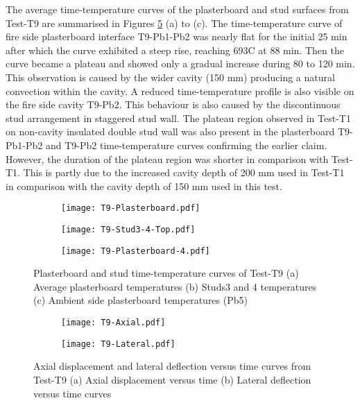 The average time-temperature curves of the plasterboard and stud surfaces from Test-T9 are summarised in Figures \ref{fig:T9-time-temperature-b} (a) to (c). The time-temperature curve of fire side plasterboard interface T9-Pb1-Pb2 was nearly flat for the initial 25 min after which the curve exhibited a steep rise, reaching 693\degree C at 88 min. Then the curve became a plateau and showed only a gradual increase during 80 to 120 min. This observation is caused by the wider cavity (150 mm) producing a natural convection within the cavity. A reduced time-temperature profile is also visible on the fire side cavity T9-Pb2. This behaviour is also caused by the discontinuous stud arrangement in staggered stud wall. The plateau region observed in Test-T1 on non-cavity insulated double stud wall was also present in the plasterboard T9-Pb1-Pb2 and T9-Pb2 time-temperature curves confirming the earlier claim. However, the duration of the plateau region was shorter in comparison with Test-T1. This is partly due to the increased cavity depth of 200 mm used in Test-T1 in comparison with the cavity depth of 150 mm used in this test.  
\begin{figure}[!htbp]
	\centering
	\begin{subfigure}[b]{0.7\textwidth}
		\centering
		\texttt{[image: T9-Plasterboard.pdf]}
		\caption{}
		\label{subfig:T9-Plasterboard}
	\end{subfigure}
	\begin{subfigure}[b]{0.7\textwidth}
		\centering
		\texttt{[image: T9-Stud3-4-Top.pdf]}
		\caption{}
		\label{subfig:T9-Studs-3-4-Top}
	\end{subfigure}
	\label{fig:T9-time-temperature-a}
\end{figure}
\begin{figure}[!htbp]
	\ContinuedFloat
	\centering
	\begin{subfigure}[b]{0.7\textwidth}
		\centering
		\texttt{[image: T9-Plasterboard-4.pdf]}
		\caption{}
		\label{subfig:T9-Plasterboard-5}
	\end{subfigure}
	\caption{Plasterboard and stud time-temperature curves of Test-T9 (a) Average plasterboard temperatures (b) Studs3 and 4 temperatures (c) Ambient side plasterboard temperatures (Pb5) }
	\label{fig:T9-time-temperature-b}
\end{figure}
\begin{figure}[!htbp]
	\centering
	\begin{subfigure}[b]{0.7\textwidth}
		\centering
		\texttt{[image: T9-Axial.pdf]}
		\caption{}
		\label{subfig:T9-Axial}
	\end{subfigure}
	\begin{subfigure}[b]{0.7\textwidth}
		\centering
		\texttt{[image: T9-Lateral.pdf]}
		\caption{}
		\label{subfig:T9-Lateral}
	\end{subfigure}
	\caption{Axial displacement and lateral deflection versus time curves from Test-T9 (a) Axial displacement versus time (b) Lateral deflection versus time curves}
	\label{fig:T9-displacement}
\end{figure}


